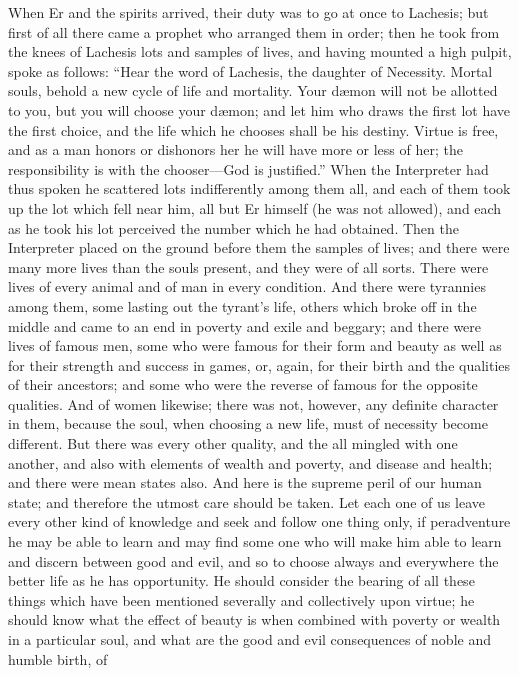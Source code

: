\documentclass[12pt]{article}
\begin{document}
When Er and the spirits arrived, their duty was to go at once to Lachesis; but
first of all there came a prophet who arranged them in order; then he took from
the knees of Lachesis lots and samples of lives, and having mounted a high
pulpit, spoke as follows: ``Hear the word of Lachesis, the daughter of
Necessity. Mortal souls, behold a new cycle of life and mortality. Your
d{\ae}mon will not be allotted to you, but you will choose your d{\ae}mon; and
let him who draws the first lot have the first choice, and the life which he
chooses shall be his destiny. Virtue is free, and as a man honors or
dishonors her he will have more or less of her; the responsibility is with the
chooser---God is justified.'' When the Interpreter had thus spoken he scattered
lots indifferently among them all, and each of them took up the lot which fell
near him, all but Er himself (he was not allowed), and each as he took his lot
perceived the number which he had obtained. Then the Interpreter placed on the
ground before them the samples of lives; and there were many more lives than
the souls present, and they were of all sorts. There were lives of every animal
and of man in every condition. And there were tyrannies among them, some
lasting out the tyrant's life, others which broke off in the middle and came to
an end in poverty and exile and beggary; and there were lives of famous men,
some who were famous for their form and beauty as well as for their strength
and success in games, or, again, for their birth and the qualities of their
ancestors; and some who were the reverse of famous for the opposite qualities.
And of women likewise; there was not, however, any definite character in them,
because the soul, when choosing a new life, must of necessity become different.
But there was every other quality, and the all mingled with one another, and
also with elements of wealth and poverty, and disease and health; and there
were mean states also. And here is the supreme peril of our human state; and
therefore the utmost care should be taken. Let each one of us leave every other
kind of knowledge and seek and follow one thing only, if peradventure he may be
able to learn and may find some one who will make him able to learn and discern
between good and evil, and so to choose always and everywhere the better life
as he has opportunity. He should consider the bearing of all these things which
have been mentioned severally and collectively upon virtue; he should know what
the effect of beauty is when combined with poverty or wealth in a particular
soul, and what are the good and evil consequences of noble and humble birth, of
\end{document}
